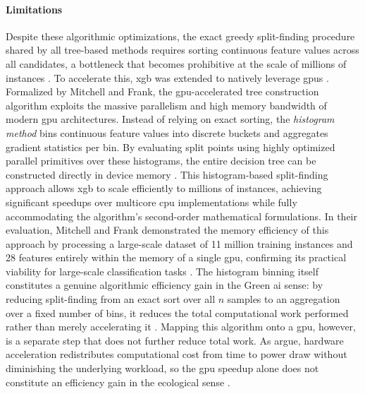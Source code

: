 \paragraph{Limitations}
Despite these algorithmic optimizations, the exact greedy split-finding procedure shared by all tree-based methods requires sorting continuous feature values across all candidates, a bottleneck that becomes prohibitive at the scale of millions of instances \parencite{chenXGBoostScalableTree2016}. To accelerate this, \gls{xgb} was extended to natively leverage \glspl{gpu} \parencite{mitchellAcceleratingXGBoostAlgorithm2017}. Formalized by Mitchell and Frank, the \gls{gpu}-accelerated tree construction algorithm exploits the massive parallelism and high memory bandwidth of modern \gls{gpu} architectures. Instead of relying on exact sorting, the \textit{histogram method} bins continuous feature values into discrete buckets and aggregates gradient statistics per bin. By evaluating split points using highly optimized parallel primitives over these histograms, the entire decision tree can be constructed directly in device memory \parencite{mitchellAcceleratingXGBoostAlgorithm2017}. This histogram-based split-finding approach allows \gls{xgb} to scale efficiently to millions of instances, achieving significant speedups over multicore \gls{cpu} implementations while fully accommodating the algorithm's second-order mathematical formulations. In their evaluation, Mitchell and Frank demonstrated the memory efficiency of this approach by processing a large-scale dataset of 11 million training instances and 28 features entirely within the memory of a single \gls{gpu}, confirming its practical viability for large-scale classification tasks \parencite{mitchellAcceleratingXGBoostAlgorithm2017}. The histogram binning itself constitutes a genuine algorithmic efficiency gain in the Green \gls{ai} sense: by reducing split-finding from an exact sort over all $n$ samples to an aggregation over a fixed number of bins, it reduces the total computational work performed rather than merely accelerating it \parencite{chenXGBoostScalableTree2016}. Mapping this algorithm onto a \gls{gpu}, however, is a separate step that does not further reduce total work. As \citeauthor{schwartzGreenAI2020} \parencite{schwartzGreenAI2020} argue, hardware acceleration redistributes computational cost from time to power draw without diminishing the underlying workload, so the \gls{gpu} speedup alone does not constitute an efficiency gain in the ecological sense \parencite{schwartzGreenAI2020}.

